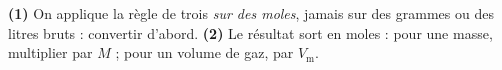 \documentclass[11pt,a4paper]{article}
\begin{document}
\begin{piege}
\textbf{(1)} On applique la règle de trois \emph{sur des moles}, jamais sur des grammes ou des litres
bruts : convertir d'abord. \textbf{(2)} Le résultat sort en moles : pour une masse, multiplier par
$M$ ; pour un volume de gaz, par $V_{\mathrm{m}}$.
\end{piege}
\end{document}
